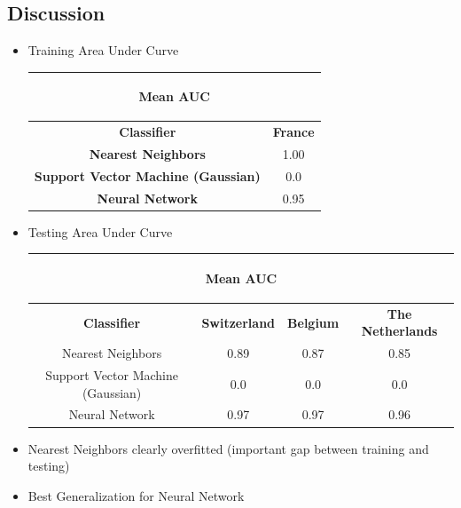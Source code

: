 \documentclass[c]{beamer}
\begin{document}
\subsection{Discussion}
\begin{itemize}
 \item Training Area Under Curve
 \begin{table}
    \begin{center}
    \begin{adjustbox}{max width=0.9\textwidth}
    {\scriptsize
    \begin{tabular}{|c|c|}
      \hline
      \multicolumn{2}{|c|}{\begin{bf} Mean AUC \end{bf}} \\
      \hline
      \textbf{Classifier} & \textbf{France} \\
      \hline
      \textbf{Nearest Neighbors} & 1.00\\
      \hline
      \textbf{Support Vector Machine (Gaussian)} & 0.0\\
      \hline
      \textbf{Neural Network} & 0.95\\
      \hline
    \end{tabular}
    }
    \end{adjustbox}
    \end{center}
  \end{table}
  
  \item Testing Area Under Curve
 \begin{table}
    \begin{center}
    \begin{adjustbox}{max width=0.9\textwidth}
    {\scriptsize
    \begin{tabular}{|c|c|c|c|}
      \hline
      \multicolumn{4}{|c|}{\begin{bf} Mean AUC\end{bf}} \\
      \hline
      \textbf{Classifier} & \textbf{Switzerland} & \textbf{Belgium} & \textbf{The Netherlands}\\
      \hline
      Nearest Neighbors & 0.89 & 0.87 & 0.85\\
      \hline
      Support Vector Machine (Gaussian) & 0.0 & 0.0 & 0.0\\
      \hline
      Neural Network & 0.97 & 0.97 & 0.96\\
      \hline
    \end{tabular}
    }
    \end{adjustbox}
    \end{center}
  \end{table}
  \item Nearest Neighbors clearly overfitted (important gap between training and testing)
  \item Best Generalization for Neural Network
  
\end{itemize}
\end{document}
